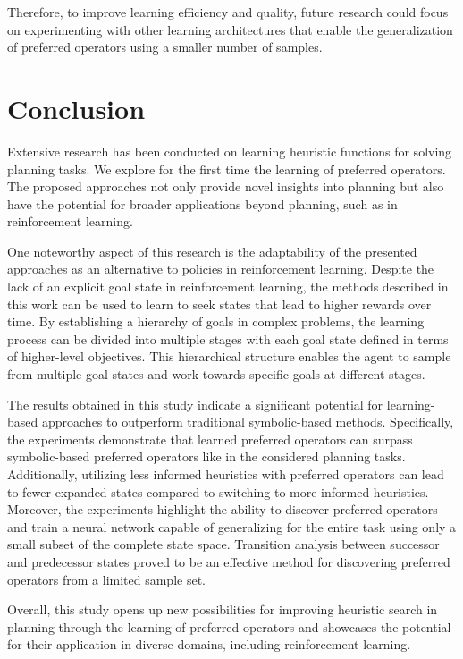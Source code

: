 \documentclass[ppgc,diss,english]{iiufrgs}
\begin{document}
Therefore, to improve learning efficiency and quality, future research could focus on experimenting with other learning architectures that enable the generalization of preferred operators using a smaller number of samples.

\chapter{Conclusion}
\label{cha:conclusion}
Extensive research has been conducted on learning heuristic functions for solving planning tasks. We explore for the first time the learning of preferred operators. The proposed approaches not only provide novel insights into planning but also have the potential for broader applications beyond planning, such as in reinforcement learning.

One noteworthy aspect of this research is the adaptability of the presented approaches as an alternative to policies in reinforcement learning. Despite the lack of an explicit goal state in reinforcement learning, the methods described in this work can be used to learn to seek states that lead to higher rewards over time. By establishing a hierarchy of goals in complex problems, the learning process can be divided into multiple stages with each goal state defined in terms of higher-level objectives. This hierarchical structure enables the agent to sample from multiple goal states and work towards specific goals at different stages.

The results obtained in this study indicate a significant potential for learning-based approaches to outperform traditional symbolic-based methods. Specifically, the experiments demonstrate that learned preferred operators can surpass symbolic-based preferred operators like \poff in the considered planning tasks. Additionally, utilizing less informed heuristics with preferred operators can lead to fewer expanded states compared to switching to more informed heuristics. Moreover, the experiments highlight the ability to discover preferred operators and train a neural network capable of generalizing for the entire task using only a small subset of the complete state space. Transition analysis between successor and predecessor states proved to be an effective method for discovering preferred operators from a limited sample set.

Overall, this study opens up new possibilities for improving heuristic search in planning through the learning of preferred operators and showcases the potential for their application in diverse domains, including reinforcement learning.
\end{document}
